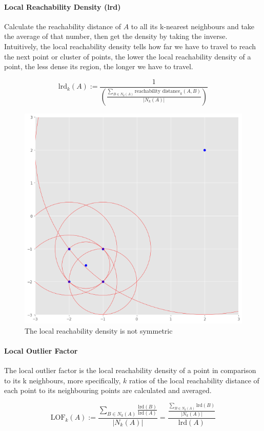 \documentclass[11pt]{article}
\begin{document}
\paragraph{Local Reachability Density (lrd)}

Calculate the reachability distance of $A$ to all its k-nearest neighbours and take the average of that number, then get the density by taking the inverse. Intuitively, the local reachability density tells how far we have to travel to reach the next point or cluster of points, the lower the local reachability density of a point, the less dense its region, the longer we have to travel.

\begin{equation}
    \text{lrd}_k (A) :=
    \frac{1}{
        \left(
        \frac{
            \sum_{B\in N_k (A)} \text{reachability distance}_k (A,B)
        }{|N_k(A)|}
        \right)
    }
\end{equation}

\begin{figure}[tbh!]
    \centering
    \includegraphics[width=0.5\linewidth, keepaspectratio]{Pictures/outlier_reachability_density}
    \caption{The local reachability density is not symmetric}
    \label{fig:outlierreachabilitydensity}
\end{figure}

\paragraph{Local Outlier Factor}

The local outlier factor is the local reachability density of a point in comparison to its k neighbours, more specifically, $k$ ratios of the local reachability distance of each point to its neighbouring points are calculated and averaged.

\begin{equation}
    \text{LOF}_k(A):= \frac{\sum_{B\in N_k (A)} \frac{\text{lrd}(B)}{\text{lrd}(A)}}{|N_k(A)|} = \frac{\frac{\sum_{B\in N_k (A)} \text{lrd}(B)}{|N_k(A)|}}{\text{lrd}(A)}
\end{equation}
\end{document}
